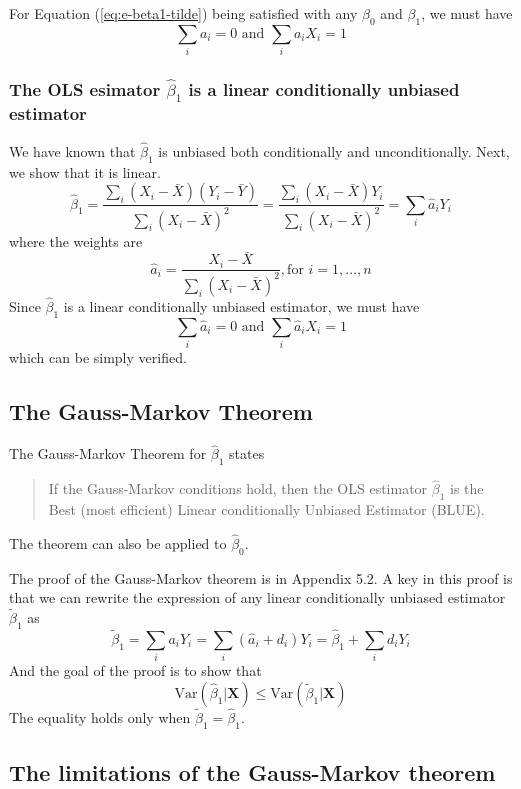 \documentclass[a4paper,11pt]{article}
\newcommand{\var}{\mathrm{Var}}
\begin{document}
For Equation (\ref{eq:e-beta1-tilde}) being satisfied with any
\(\beta_0\) and \(\beta_1\), we must have
\[ \sum_i a_i = 0 \text{ and } \sum_i a_iX_i = 1 \]

\subsubsection*{The OLS esimator \(\hat{\beta}_1\) is a linear conditionally unbiased estimator}
\label{sec:org2b504b3}

We have known that \(\hat{\beta}_1\) is unbiased both conditionally and
unconditionally. Next, we show that it is linear. 
\[ \hat{\beta}_1 = \frac{\sum_i (X_i - \bar{X})(Y_i - \bar{Y})}{\sum_i
(X_i - \bar{X})^2} = \frac{\sum_i (X_i - \bar{X})Y_i}{\sum_i
(X_i - \bar{X})^2} = \sum_i \hat{a}_i Y_i \]
where the weights are
\[ \hat{a}_i = \frac{X_i - \bar{X}}{\sum_i (X_i - \bar{X})^2}, \text{
for } i = 1, \ldots, n \] 
Since \(\hat{\beta}_1\) is a linear conditionally unbiased estimator, we
must have
\[ \sum_i \hat{a}_i = 0 \text{ and } \sum_i \hat{a}_i X_i = 1  \]
which can be simply verified.


\subsection{The Gauss-Markov Theorem}
\label{sec:org69e00cb}

The Gauss-Markov Theorem for \(\hat{\beta}_1\) states
\label{org558dfb5}
\begin{quote}
If the Gauss-Markov conditions hold, then the OLS estimator
\(\hat{\beta}_1\) is the Best (most efficient) Linear conditionally
Unbiased Estimator (BLUE).
\end{quote}

The theorem can also be applied to \(\hat{\beta}_0\).

The proof of the Gauss-Markov theorem is in Appendix 5.2. A key in
this proof is that we can rewrite the expression of any linear
conditionally unbiased estimator \(\tilde{\beta}_1\) as
\[ \tilde{\beta}_1 = \sum_i a_i Y_i = \sum_i (\hat{a}_i + d_i)Y_i =
\hat{\beta}_1 + \sum_i d_i Y_i \]
And the goal of
the proof is to show that
\[ \var(\hat{\beta}_1 | \mathbf{X}) \leq \var(\tilde{\beta}_1 |
\mathbf{X}) \]
The equality holds only when \(\tilde{\beta}_1 = \hat{\beta}_1\). 


\subsection{The limitations of the Gauss-Markov theorem}
\label{sec:org01c8a5f}
\end{document}
